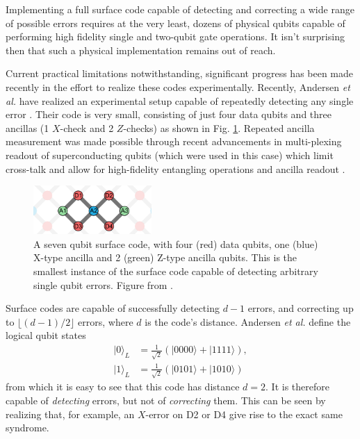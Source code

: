 Implementing a full surface code capable of detecting and correcting a wide
range of possible errors requires at the very least, dozens of physical qubits
capable of performing high fidelity single and two-qubit gate operations. It
isn't surprising then that such a physical implementation remains out of reach.

Current practical limitations notwithstanding, significant progress has been
made recently in the effort to realize these codes experimentally. Recently,
Andersen \textit{et al.} have realized an experimental setup capable of
repeatedly detecting any single error \cite{Andersen_2020}. Their code is very
small, consisting of just four data qubits and three ancillas (1 $X$-check and 2
$Z$-checks) as shown in Fig. \ref{fig:seven_qbit_code}. Repeated ancilla
measurement was made possible through recent advancements in multi-plexing
readout of superconducting qubits (which were used in this case) which limit
cross-talk and allow for high-fidelity entangling operations and ancilla readout
\cite{barends14_super_quant_circuit_at_surfac} \cite{Bultink_2020}.

\begin{figure}[h]
  \centering
  \includegraphics[width=0.4\textwidth]{images/seven_qbit_code.pdf}
  \caption{A seven qubit surface code, with four (red) data qubits, one (blue)
    X-type ancilla and 2 (green) Z-type ancilla qubits. This is the smallest
    instance of the surface code capable of detecting arbitrary single qubit
    errors. Figure from \cite{Andersen_2020}.}
  \label{fig:seven_qbit_code}
\end{figure}

Surface codes are capable of successfully detecting $d-1$ errors, and correcting
up to $\lfloor{(d-1)/2} \rfloor$ errors, where $d$ is the code's distance.
Andersen \textit{et al.} define the logical qubit states
\begin{align}
|0\rangle_L &= \frac{1}{\sqrt{2}} (|0000\rangle + |1111\rangle) , \\
|1\rangle_L &= \frac{1}{\sqrt{2}} (|0101\rangle + |1010\rangle) 
\end{align}
from which it is easy to see that this code has distance $d=2$. It is therefore
capable of \textit{detecting} errors, but not of \textit{correcting} them. This
can be seen by realizing that, for example, an $X$-error on D2 or D4 give rise
to the exact same syndrome.

